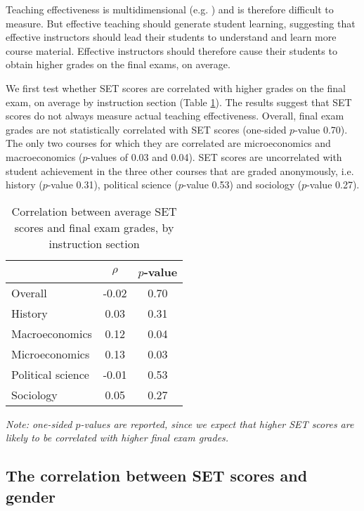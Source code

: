 \documentclass[12pt]{article}
\begin{document}
Teaching effectiveness is multidimensional (e.g. \citet{Marsh1997}) and is therefore difficult to measure. But effective teaching should generate student learning, suggesting that effective instructors should lead their students to understand and learn more course material. Effective instructors should therefore cause their students to obtain higher grades on the final exams, on average. 

We first test whether SET scores are correlated with higher grades on the final exam, on average by instruction section (Table \ref{tab:finalexam}). The results suggest that SET scores do not always measure actual teaching effectiveness. Overall, final exam grades are not statistically correlated with SET scores (one-sided $p$-value 0.70). The only two courses for which they are correlated are microeconomics and macroeconomics ($p$-values of 0.03 and 0.04). SET scores are uncorrelated with student achievement in the three other courses that are graded anonymously, i.e. history ($p$-value 0.31), political science ($p$-value 0.53) and sociology ($p$-value 0.27). 

\begin{table}[htbp]
  \centering
  \footnotesize 
  \caption{Correlation between average SET scores and final exam grades, by instruction section}
    \begin{tabular}{lcc}
    \toprule 
                        & $\rho$  & $p$-value  \\
   \midrule
    Overall &            -0.02 &       0.70  \\
    History &             0.03 &       0.31  \\
    Macroeconomics &      0.12 &       0.04  \\
    Microeconomics &      0.13 &       0.03  \\
    Political science &  -0.01 &       0.53  \\
    Sociology &           0.05 &       0.27  \\
    \bottomrule
    \end{tabular}%
 \label{tab:finalexam}%
 
  \textit{Note: one-sided $p$-values are reported, since we expect that higher SET scores are likely to be correlated with higher final exam grades.}
\end{table}%
\normalsize




\subsection{The correlation between SET scores and gender}
\end{document}
